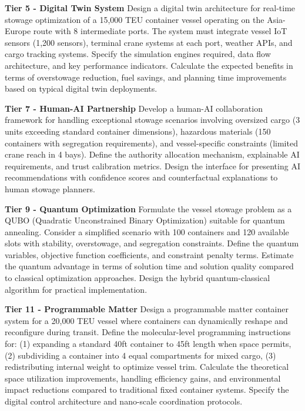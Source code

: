 \documentclass{article}
\begin{document}
\textbf{Tier 5 - Digital Twin System}
Design a digital twin architecture for real-time stowage optimization of a 15,000 TEU container vessel operating on the Asia-Europe route with 8 intermediate ports. The system must integrate vessel IoT sensors (1,200 sensors), terminal crane systems at each port, weather APIs, and cargo tracking systems. Specify the simulation engines required, data flow architecture, and key performance indicators. Calculate the expected benefits in terms of overstowage reduction, fuel savings, and planning time improvements based on typical digital twin deployments.

\textbf{Tier 7 - Human-AI Partnership}
Develop a human-AI collaboration framework for handling exceptional stowage scenarios involving oversized cargo (3 units exceeding standard container dimensions), hazardous materials (150 containers with segregation requirements), and vessel-specific constraints (limited crane reach in 4 bays). Define the authority allocation mechanism, explainable AI requirements, and trust calibration metrics. Design the interface for presenting AI recommendations with confidence scores and counterfactual explanations to human stowage planners.

\textbf{Tier 9 - Quantum Optimization}
Formulate the vessel stowage problem as a QUBO (Quadratic Unconstrained Binary Optimization) suitable for quantum annealing. Consider a simplified scenario with 100 containers and 120 available slots with stability, overstowage, and segregation constraints. Define the quantum variables, objective function coefficients, and constraint penalty terms. Estimate the quantum advantage in terms of solution time and solution quality compared to classical optimization approaches. Design the hybrid quantum-classical algorithm for practical implementation.

\textbf{Tier 11 - Programmable Matter}
Design a programmable matter container system for a 20,000 TEU vessel where containers can dynamically reshape and reconfigure during transit. Define the molecular-level programming instructions for: (1) expanding a standard 40ft container to 45ft length when space permits, (2) subdividing a container into 4 equal compartments for mixed cargo, (3) redistributing internal weight to optimize vessel trim. Calculate the theoretical space utilization improvements, handling efficiency gains, and environmental impact reductions compared to traditional fixed container systems. Specify the digital control architecture and nano-scale coordination protocols.
\end{document}

